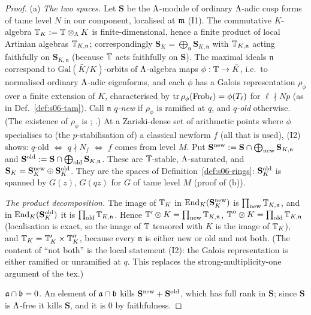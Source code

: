 \begin{proof}
(a) \emph{The two spaces.} Let $\mathbf S$ be the $\Lambda$-module of ordinary $\Lambda$-adic cusp forms of tame level $N$ in our component,
localised at $\mathfrak{m}$ (I1). The commutative $K$-algebra $\mathbb{T}_K:=\mathbb{T}\otimes_\Lambda K$ is finite-dimensional, hence a finite product of local
Artinian algebras $\mathbb{T}_{K,\mathfrak n}$; correspondingly $\mathbf S_K=\bigoplus_{\mathfrak n}\mathbf S_{K,\mathfrak n}$ with $\mathbb{T}_{K,\mathfrak n}$ acting
faithfully on $\mathbf S_{K,\mathfrak n}$ (because $\mathbb{T}$ acts faithfully on $\mathbf S$). The maximal ideals $\mathfrak n$ correspond to
$\mathrm{Gal}(\bar K/K)$-orbits of $\Lambda$-algebra maps $\phi:\mathbb{T}\to\bar K$, i.e.\ to normalised ordinary $\Lambda$-adic eigenforms, and each
$\phi$ has a Galois representation $\rho_\phi$ over a finite extension of $K$, characterised by $\operatorname{tr}\rho_\phi(\mathrm{Frob}_\ell)=\phi(T_\ell)$
for $\ell\nmid Np$ (as in Def.~\ref{def:s06-tam}). Call $\mathfrak n$ \emph{$q$-new} if $\rho_\phi$ is ramified at $q$, and \emph{$q$-old}
otherwise. (The existence of $\rho_\phi$ is \cite[Thm~2.1]{Hi86a}; \stcited{}.) At a Zariski-dense set of arithmetic points where $\phi$ specialises to (the $p$-stabilisation of) a classical newform $f$ (all that is used), (I2) shows: $q$-old
$\iff$ $q\nmid N_f$ $\iff$ $f$ comes from level $M$. Put $\mathbf S^{\rm new}:=\mathbf S\cap\bigoplus_{\text{new}}\mathbf S_{K,\mathfrak n}$ and
$\mathbf S^{\rm old}:=\mathbf S\cap\bigoplus_{\text{old}}\mathbf S_{K,\mathfrak n}$. These are $\mathbb{T}$-stable, $\Lambda$-saturated, and
$\mathbf S_K=\mathbf S^{\rm new}_K\oplus\mathbf S^{\rm old}_K$. They are the spaces of Definition~\ref{def:s06-rings}: $\mathbf S^{\rm old}_K$ is
spanned by $G(z)$, $G(qz)$ for $G$ of tame level $M$ (proof of (b)).

\emph{The product decomposition.} The image of $\mathbb{T}_K$ in $\operatorname{End}_K(\mathbf S^{\rm new}_K)$ is $\prod_{\text{new}}\mathbb{T}_{K,\mathfrak n}$, and in
$\operatorname{End}_K(\mathbf S^{\rm old}_K)$ it is $\prod_{\text{old}}\mathbb{T}_{K,\mathfrak n}$. Hence $\mathbb{T}'\otimes K=\prod_{\rm new}\mathbb{T}_{K,\mathfrak n}$,
$\mathbb{T}''\otimes K=\prod_{\rm old}\mathbb{T}_{K,\mathfrak n}$ (localisation is exact, so the image of $\mathbb{T}$ tensored with $K$ is the image of
$\mathbb{T}_K$), and $\mathbb{T}_K=\mathbb{T}'_K\times\mathbb{T}''_K$, because every $\mathfrak n$ is either new or old and not both. (The content of ``not both'' is the
local statement (I2): the Galois representation is either ramified or unramified at $q$. This replaces the strong-multiplicity-one
argument of the tex.)

\emph{$\mathfrak{a}\cap\mathfrak{b}=0$.} An element of $\mathfrak{a}\cap\mathfrak{b}$ kills $\mathbf S^{\rm new}+\mathbf S^{\rm old}$, which has full rank in $\mathbf S$; since
$\mathbf S$ is $\Lambda$-free it kills $\mathbf S$, and it is $0$ by faithfulness.


\end{proof}
